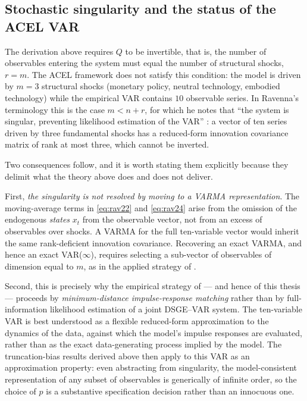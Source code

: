 \subsection{Stochastic singularity and the status of the ACEL VAR}
\label{sec:singularity}

The derivation above requires $Q$ to be invertible, that is, the number
of observables entering the system must equal the number of structural
shocks, $r = m$. The ACEL framework does not satisfy this condition: the
model is driven by $m = 3$ structural shocks (monetary policy, neutral
technology, embodied technology) while the empirical VAR contains
$10$ observable series. In Ravenna's terminology this is the case
$m < n + r$, for which he notes that ``the system is singular, preventing
likelihood estimation of the VAR'' \citep[p.~2050]{Ravenna2007}: a vector
of ten series driven by three fundamental shocks has a reduced-form
innovation covariance matrix of rank at most three, which cannot be
inverted.

Two consequences follow, and it is worth stating them explicitly because
they delimit what the theory above does and does not deliver.

First, \emph{the singularity is not resolved by moving to a VARMA
representation}. The moving-average terms in \eqref{eq:rav22} and
\eqref{eq:rav24} arise from the omission of the endogenous \emph{states}
$x_t$ from the observable vector, not from an excess of observables over
shocks. A VARMA for the full ten-variable vector would inherit the same
rank-deficient innovation covariance. Recovering an exact VARMA, and
hence an exact VAR($\infty$), requires selecting a sub-vector of
observables of dimension equal to $m$, as in the applied strategy of
\citet{CEV2006}.

Second, this is precisely why the empirical strategy of
\citet{ACEL2011} --- and hence of this thesis --- proceeds by
\emph{minimum-distance impulse-response matching} rather than by
full-information likelihood estimation of a joint DSGE--VAR system. The
ten-variable VAR is best understood as a flexible reduced-form
approximation to the dynamics of the data, against which the model's
impulse responses are evaluated, rather than as the exact
data-generating process implied by the model. The truncation-bias results
derived above then apply to this VAR as an approximation property: even
abstracting from singularity, the model-consistent representation of any
subset of observables is generically of infinite order, so the choice of
$p$ is a substantive specification decision rather than an innocuous
one.

